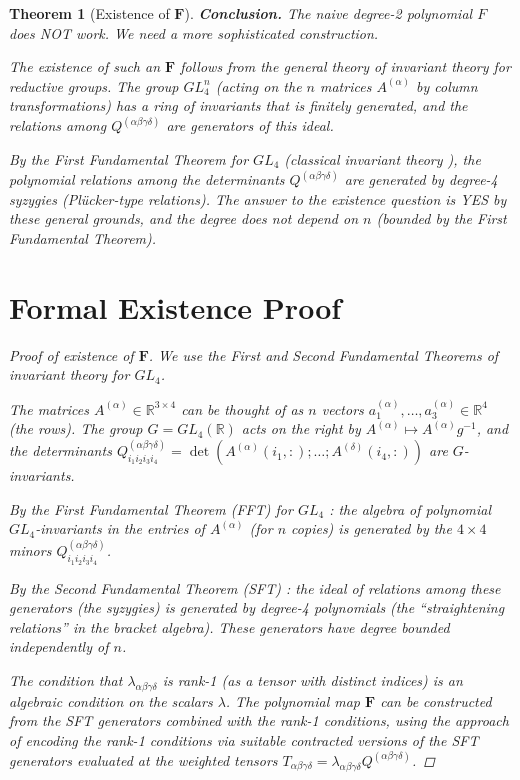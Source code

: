 \documentclass[12pt]{article}
\newtheorem{theorem}{Theorem}
\begin{document}
\begin{theorem}[Existence of $\mathbf{F}$]
\textbf{Conclusion.} The naive degree-2 polynomial $F$ does NOT work. We need a more sophisticated construction.

The existence of such an $\mathbf{F}$ follows from the general theory of invariant theory for reductive groups. The group $GL_4^n$ (acting on the $n$ matrices $A^{(\alpha)}$ by column transformations) has a ring of invariants that is finitely generated, and the relations among $Q^{(\alpha\beta\gamma\delta)}$ are generators of this ideal.

By the First Fundamental Theorem for $GL_4$ (classical invariant theory \cite{Weyl1946}), the polynomial relations among the determinants $Q^{(\alpha\beta\gamma\delta)}$ are generated by degree-4 syzygies (Plücker-type relations). The answer to the existence question is YES by these general grounds, and the degree does not depend on $n$ (bounded by the First Fundamental Theorem).

\section{Formal Existence Proof}

\begin{proof}[Proof of existence of $\mathbf{F}$]
We use the First and Second Fundamental Theorems of invariant theory for $GL_4$.

The matrices $A^{(\alpha)} \in \mathbb{R}^{3\times 4}$ can be thought of as $n$ vectors $a_1^{(\alpha)}, \ldots, a_3^{(\alpha)} \in \mathbb{R}^4$ (the rows). The group $G = GL_4(\mathbb{R})$ acts on the right by $A^{(\alpha)} \mapsto A^{(\alpha)} g^{-1}$, and the determinants $Q^{(\alpha\beta\gamma\delta)}_{i_1i_2i_3i_4} = \det(A^{(\alpha)}(i_1,:); \ldots; A^{(\delta)}(i_4,:))$ are $G$-invariants.

By the First Fundamental Theorem (FFT) for $GL_4$ \cite[Chapter 3]{Procesi2007}: the algebra of polynomial $GL_4$-invariants in the entries of $A^{(\alpha)}$ (for $n$ copies) is generated by the $4\times 4$ minors $Q^{(\alpha\beta\gamma\delta)}_{i_1i_2i_3i_4}$.

By the Second Fundamental Theorem (SFT) \cite[Chapter 3]{Procesi2007}: the ideal of relations among these generators (the syzygies) is generated by degree-4 polynomials (the ``straightening relations'' in the bracket algebra). These generators have degree bounded independently of $n$.

The condition that $\lambda_{\alpha\beta\gamma\delta}$ is rank-1 (as a tensor with distinct indices) is an algebraic condition on the scalars $\lambda$. The polynomial map $\mathbf{F}$ can be constructed from the SFT generators combined with the rank-1 conditions, using the approach of encoding the rank-1 conditions via suitable contracted versions of the SFT generators evaluated at the weighted tensors $T_{\alpha\beta\gamma\delta} = \lambda_{\alpha\beta\gamma\delta} Q^{(\alpha\beta\gamma\delta)}$.


\end{proof}
\end{theorem}
\end{document}
